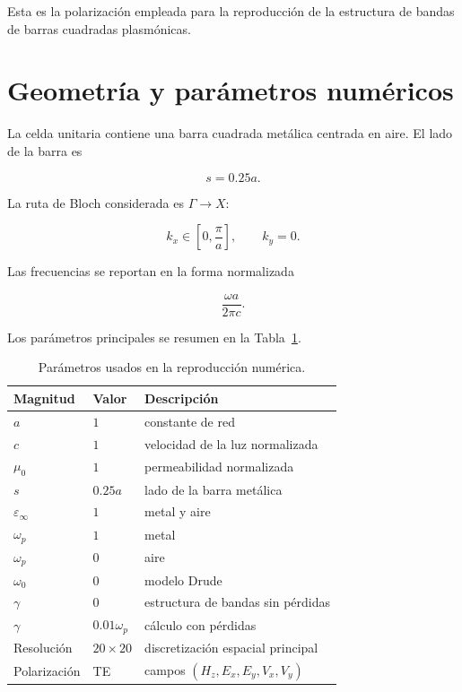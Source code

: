 \documentclass[11pt,a4paper]{article}
\newcommand{\epsinf}{\varepsilon_\infty}
\newcommand{\omegap}{\omega_p}
\newcommand{\omegao}{\omega_0}
\begin{document}
Esta es la polarización empleada para la reproducción de la estructura de
bandas de barras cuadradas plasmónicas.

\section{Geometría y parámetros numéricos}

La celda unitaria contiene una barra cuadrada metálica centrada en aire. El
lado de la barra es

\begin{equation}
  s = 0.25a.
  \label{eq:side}
\end{equation}

La ruta de Bloch considerada es $\Gamma \rightarrow X$:

\begin{equation}
  k_x \in \left[0,\frac{\pi}{a}\right],
  \qquad
  k_y = 0.
\end{equation}

Las frecuencias se reportan en la forma normalizada

\begin{equation}
  \frac{\omega a}{2\pi c}.
  \label{eq:normalized_frequency}
\end{equation}

Los parámetros principales se resumen en la Tabla~\ref{tab:parameters}.

\begin{table}[H]
  \centering
  \caption{Parámetros usados en la reproducción numérica.}
  \label{tab:parameters}
  \begin{tabular}{lll}
    \toprule
    Magnitud & Valor & Descripción \\
    \midrule
    $a$ & $1$ & constante de red \\
    $c$ & $1$ & velocidad de la luz normalizada \\
    $\mu_0$ & $1$ & permeabilidad normalizada \\
    $s$ & $0.25a$ & lado de la barra metálica \\
    $\epsinf$ & $1$ & metal y aire \\
    $\omegap$ & $1$ & metal \\
    $\omegap$ & $0$ & aire \\
    $\omegao$ & $0$ & modelo Drude \\
    $\gamma$ & $0$ & estructura de bandas sin pérdidas \\
    $\gamma$ & $0.01\omegap$ & cálculo con pérdidas \\
    Resolución & $20\times20$ & discretización espacial principal \\
    Polarización & TE & campos $(H_z,E_x,E_y,V_x,V_y)$ \\
    \bottomrule
  \end{tabular}
\end{table}
\end{document}
